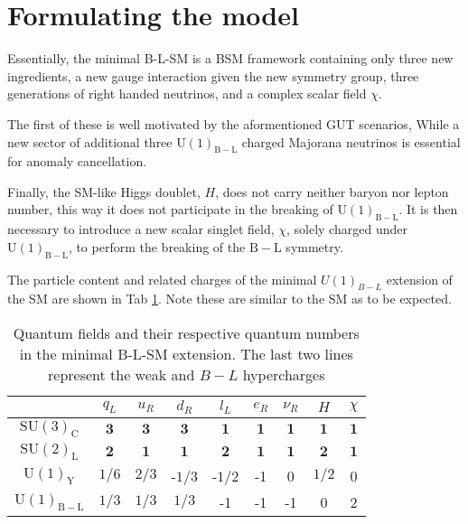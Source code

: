
\section{Formulating the model}

Essentially, the minimal B-L-SM is a BSM framework containing only three new ingredients, a new gauge interaction given the new symmetry group, three generations of right handed neutrinos, and a complex scalar field $\chi$. 

The first of these is well motivated by the aformentioned GUT scenarios, While a new sector of additional three $\mathrm{U(1)_{B-L}}$ charged Majorana neutrinos is essential for anomaly cancellation.
%

Finally, the SM-like Higgs doublet, $H$, does not carry neither baryon nor lepton number, this way it does not participate in the breaking of $\mathrm{U(1)_{B-L}}$. It is then necessary to introduce a new scalar singlet field, $\chi$, solely charged under $\mathrm{U(1)_{B-L}}$, to perform the breaking of the $\mathrm{B-L}$ symmetry.

The particle content and related charges of the minimal $U(1)_{B-L}$ extension of the SM are shown in Tab \ref{tab:BLSM_Charges}. Note these are similar to the SM as to be expected. 
%
\begin{table}[H]
\centering
\begin{tabular}{|c|c|c|c|c|c|c|c|c|}
\hline
  & $q_L$  & $u_R$ & $d_R$ & $l_L$  & $e_R$ & $\nu_R$  &  $H$  & $\chi$  \\ \hline
 $\mathrm{SU(3)_C}$& $\mathbf{3}$ & $\mathbf{3}$  & $\mathbf{3}$  & $\mathbf{1}$  & $\mathbf{1}$   & $\mathbf{1}$   & $\mathbf{1}$    & $\mathbf{1}$    \\
 $\mathrm{SU(2)_L}$& $\mathbf{2}$  & $\mathbf{1}$ & $\mathbf{1}$ & $\mathbf{2}$ & $\mathbf{1}$ & $\mathbf{1}$ & $\mathbf{2}$  & $\mathbf{1}$ \\
$\mathrm{U(1)_Y}$ & ${1}/{6}$ & ${2}/{3}$  & -${1}/{3}$  & -${1}/{2}$ & -1 & 0 & ${1}/{2}$ & 0 \\
$\mathrm{U(1)_{B-L}}$ & ${1}/{3}$ & ${1}/{3}$ & ${1}/{3}$  & -1  & -1 &-1  & 0 & 2  \\ \hline 
\end{tabular}
\caption{Quantum fields and their respective quantum numbers in the minimal B-L-SM extension. The last two lines represent the weak and $B-L$ hypercharges}
\label{tab:BLSM_Charges}
\end{table} 

